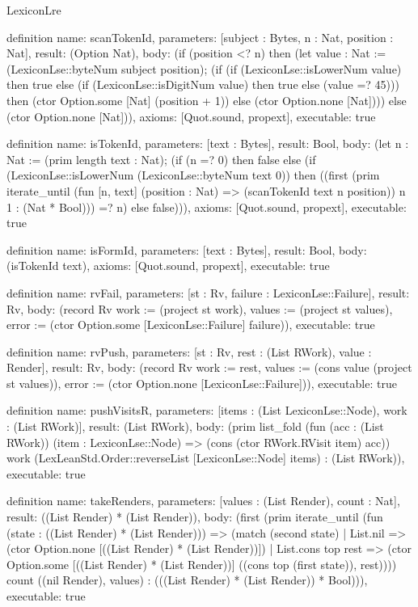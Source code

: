 \begin{lexlean}{LexiconLre}
\begin{semanticmodule}
definition{
  name: scanTokenId,
  parameters: [subject : Bytes, n : Nat, position : Nat],
  result: (Option Nat),
  body: (if (position <? n) then (let value : Nat := (LexiconLse::byteNum subject position); (if (if (LexiconLse::isLowerNum value) then true else (if (LexiconLse::isDigitNum value) then true else (value =? 45))) then (ctor Option.some [Nat] (position + 1)) else (ctor Option.none [Nat]))) else (ctor Option.none [Nat])),
  axioms: [Quot.sound, propext],
  executable: true
}

definition{
  name: isTokenId,
  parameters: [text : Bytes],
  result: Bool,
  body: (let n : Nat := (prim length text : Nat); (if (n =? 0) then false else (if (LexiconLse::isLowerNum (LexiconLse::byteNum text 0)) then ((first (prim iterate_until (fun [n, text] (position : Nat) => (scanTokenId text n position)) n 1 : (Nat * Bool))) =? n) else false))),
  axioms: [Quot.sound, propext],
  executable: true
}

definition{
  name: isFormId,
  parameters: [text : Bytes],
  result: Bool,
  body: (isTokenId text),
  axioms: [Quot.sound, propext],
  executable: true
}

definition{
  name: rvFail,
  parameters: [st : Rv, failure : LexiconLse::Failure],
  result: Rv,
  body: (record Rv {work := (project st work), values := (project st values), error := (ctor Option.some [LexiconLse::Failure] failure)}),
  executable: true
}

definition{
  name: rvPush,
  parameters: [st : Rv, rest : (List RWork), value : Render],
  result: Rv,
  body: (record Rv {work := rest, values := (cons value (project st values)), error := (ctor Option.none [LexiconLse::Failure])}),
  executable: true
}

definition{
  name: pushVisitsR,
  parameters: [items : (List LexiconLse::Node), work : (List RWork)],
  result: (List RWork),
  body: (prim list_fold (fun (acc : (List RWork)) (item : LexiconLse::Node) => (cons (ctor RWork.RVisit item) acc)) work (LexLeanStd.Order::reverseList [LexiconLse::Node] items) : (List RWork)),
  executable: true
}

definition{
  name: takeRenders,
  parameters: [values : (List Render), count : Nat],
  result: ((List Render) * (List Render)),
  body: (first (prim iterate_until (fun (state : ((List Render) * (List Render))) => (match (second state)
    | List.nil => (ctor Option.none [((List Render) * (List Render))])
    | List.cons top rest => (ctor Option.some [((List Render) * (List Render))] ((cons top (first state)), rest)))) count ((nil Render), values) : (((List Render) * (List Render)) * Bool))),
  executable: true
}


\end{semanticmodule}
\end{lexlean}

